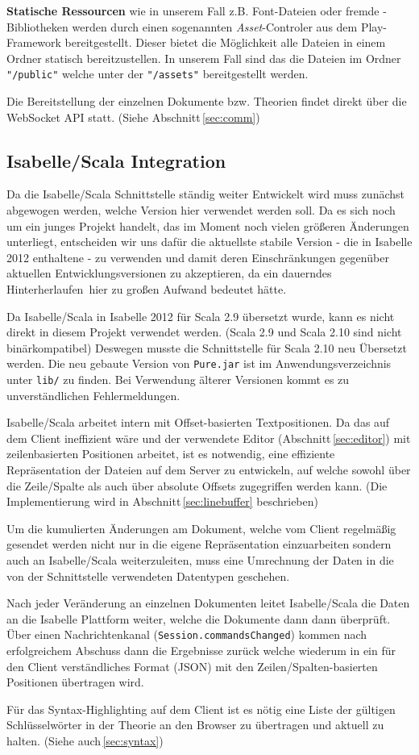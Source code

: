\textbf{Statische Ressourcen} wie in unserem Fall z.B. Font-Dateien oder fremde -Bibliotheken
werden durch einen sogenannten \textit{Asset}-Controler aus dem Play-Framework bereitgestellt.
Dieser bietet die Möglichkeit alle Dateien in einem Ordner statisch bereitzustellen. In unserem Fall
sind das die Dateien im Ordner \texttt{"/public"} welche unter der  \texttt{"/assets"}
bereitgestellt werden.

Die Bereitstellung der einzelnen Dokumente bzw. Theorien findet direkt über die WebSocket API statt.
(Siehe Abschnitt\,\ref{sec:comm})

\subsection{Isabelle/Scala Integration}

Da die Isabelle/Scala Schnittstelle ständig weiter Entwickelt wird muss zunächst abgewogen werden,
welche Version hier verwendet werden soll. Da es sich noch um ein junges Projekt handelt, das im
Moment noch vielen größeren Änderungen unterliegt, entscheiden wir uns dafür die aktuellste stabile
Version - die in Isabelle 2012 enthaltene - zu verwenden und damit deren Einschränkungen gegenüber
aktuellen Entwicklungsversionen zu akzeptieren, da ein dauerndes \glqq Hinterherlaufen\grqq\ hier zu
großen Aufwand bedeutet hätte.

Da Isabelle/Scala in Isabelle 2012 für Scala 2.9 übersetzt wurde, kann es nicht direkt in diesem
Projekt verwendet werden. (Scala 2.9 und Scala 2.10 sind nicht binärkompatibel) Deswegen musste die
Schnittstelle für Scala 2.10 neu Übersetzt werden. Die neu gebaute Version von \texttt{Pure.jar} ist
im Anwendungsverzeichnis unter \texttt{lib/} zu finden. Bei Verwendung älterer Versionen kommt es zu
unverständlichen Fehlermeldungen.

Isabelle/Scala arbeitet intern mit Offset-basierten Textpositionen. Da das auf dem Client ineffizient
wäre und der verwendete Editor (Abschnitt\,\ref{sec:editor}) mit zeilenbasierten Positionen arbeitet,
ist es notwendig, eine effiziente Repräsentation der Dateien auf dem Server zu entwickeln, auf
welche sowohl über die Zeile/Spalte als auch über absolute Offsets zugegriffen werden kann. (Die
Implementierung wird in Abschnitt\,\ref{sec:linebuffer} beschrieben) 

Um die kumulierten Änderungen am Dokument, welche vom Client regelmäßig gesendet werden nicht nur
in die eigene Repräsentation einzuarbeiten sondern auch an Isabelle/Scala weiterzuleiten, muss eine
Umrechnung der Daten in die von der Schnittstelle verwendeten Datentypen geschehen.

Nach jeder Veränderung an einzelnen Dokumenten leitet Isabelle/Scala die Daten an die Isabelle
Plattform weiter, welche die Dokumente dann dann überprüft. Über einen Nachrichtenkanal
(\texttt{Session.commandsChanged}) kommen nach erfolgreichem Abschuss dann die Ergebnisse zurück
welche wiederum in ein für den Client verständliches Format (JSON) mit den Zeilen/Spalten-basierten
Positionen übertragen wird.

Für das Syntax-Highlighting auf dem Client ist es nötig eine Liste der gültigen Schlüsselwörter in
der Theorie an den Browser zu übertragen und aktuell zu halten. (Siehe auch\,\ref{sec:syntax})